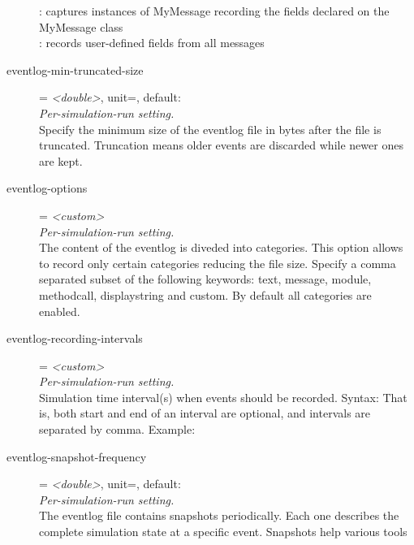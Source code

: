\begin{description}
    :
    captures instances of MyMessage recording the fields declared on the
    MyMessage class\\
      : records
    user-defined fields from all messages
\item[eventlog-min-truncated-size] = \textit{<double>}, unit=, default: \\
    \textit{Per-simulation-run setting.}\\
    Specify the minimum size of the eventlog file in bytes after the file is
    truncated. Truncation means older events are discarded while newer ones are
    kept.
\item[eventlog-options] = \textit{<custom>}\\
    \textit{Per-simulation-run setting.}\\
    The content of the eventlog is diveded into categories. This option allows
    to record only certain categories reducing the file size. Specify a comma
    separated subset of the following keywords: text, message, module,
    methodcall, displaystring and custom. By default all categories are
    enabled.
\item[eventlog-recording-intervals] = \textit{<custom>}\\
    \textit{Per-simulation-run setting.}\\
    Simulation time interval(s) when events should be recorded. Syntax:
     That is,
    both start and end of an interval are optional, and intervals are separated
    by comma. Example: 
\item[eventlog-snapshot-frequency] = \textit{<double>}, unit=, default: \\
    \textit{Per-simulation-run setting.}\\
    The eventlog file contains snapshots periodically. Each one describes the
    complete simulation state at a specific event. Snapshots help various tools

\end{description}
